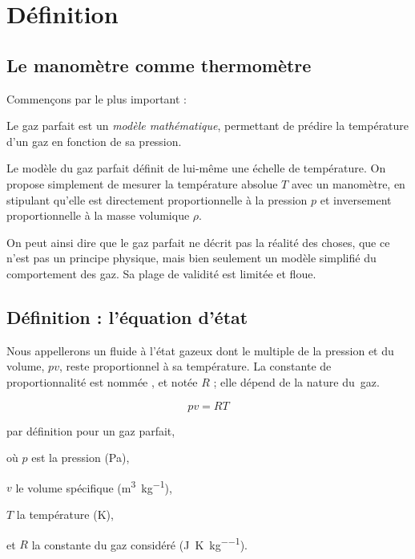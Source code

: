 \section{Définition}

	\subsection{Le manomètre comme thermomètre}
	\label{ch_le_manomètre_comme_thermomètre}

		Commençons par le plus important :

		\begin{trucimportant}
			Le gaz parfait est un \textit{modèle mathématique},\linebreak
			permettant de prédire la température d’un gaz en fonction de sa pression.
		\end{trucimportant}

		Le modèle du gaz parfait définit de lui-même une échelle de température. On propose simplement de mesurer la température absolue $T$ avec un manomètre, en stipulant qu’elle est directement proportionnelle à la pression $p$ et inversement proportionnelle à la masse volumique $\rho$.

		On peut ainsi dire que le gaz parfait ne décrit pas la réalité des choses, que ce n’est pas un principe physique, mais bien seulement un modèle simplifié du comportement des gaz. Sa plage de validité est limitée et floue.



		\subsection{Définition : l’équation d’état}

		Nous appellerons  un fluide à l’état gazeux dont le multiple de la pression et du volume, $p v$, reste proportionnel à sa température. La constante de proportionnalité est nommée , et notée $R$ ; elle dépend de la nature du~gaz.

		\begin{equation}
			p v = R T
			\label{eq_pv=RT}
		\end{equation}

		\begin{equationterms}
			\item par définition pour un gaz parfait,
			\item où \tab $p$ \tab est la pression (\si{\pascal}),
			\item \tab $v$ \tab le volume spécifique (\si{\metre\cubed\per\kilogram}),
			\item \tab $T$ \tab la température (\si{\kelvin}),
			\item et \tab $R$ \tab la constante du gaz considéré (\si{\joule\per\kelvin\per\kilogram}).
		\end{equationterms}

